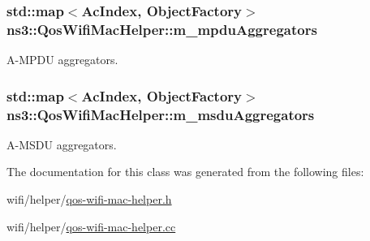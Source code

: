 \subsubsection[{\texorpdfstring{m\+\_\+mpdu\+Aggregators}{m_mpduAggregators}}]{\setlength{\rightskip}{0pt plus 5cm}std\+::map$<${\bf Ac\+Index}, {\bf Object\+Factory}$>$ ns3\+::\+Qos\+Wifi\+Mac\+Helper\+::m\+\_\+mpdu\+Aggregators\hspace{0.3cm}{\ttfamily [private]}}\hypertarget{classns3_1_1QosWifiMacHelper_a489cb3650492ad98b37ba54e87f97c15}{}\label{classns3_1_1QosWifiMacHelper_a489cb3650492ad98b37ba54e87f97c15}


A-\/\+M\+P\+DU aggregators. 

\subsubsection[{\texorpdfstring{m\+\_\+msdu\+Aggregators}{m_msduAggregators}}]{\setlength{\rightskip}{0pt plus 5cm}std\+::map$<${\bf Ac\+Index}, {\bf Object\+Factory}$>$ ns3\+::\+Qos\+Wifi\+Mac\+Helper\+::m\+\_\+msdu\+Aggregators\hspace{0.3cm}{\ttfamily [private]}}\hypertarget{classns3_1_1QosWifiMacHelper_a96ac4b7291dd02ef475a44d56ab64ab4}{}\label{classns3_1_1QosWifiMacHelper_a96ac4b7291dd02ef475a44d56ab64ab4}


A-\/\+M\+S\+DU aggregators. 



The documentation for this class was generated from the following files\+:\begin{DoxyCompactItemize}
\item 
wifi/helper/\hyperlink{qos-wifi-mac-helper_8h}{qos-\/wifi-\/mac-\/helper.\+h}\item 
wifi/helper/\hyperlink{qos-wifi-mac-helper_8cc}{qos-\/wifi-\/mac-\/helper.\+cc}\end{DoxyCompactItemize}
